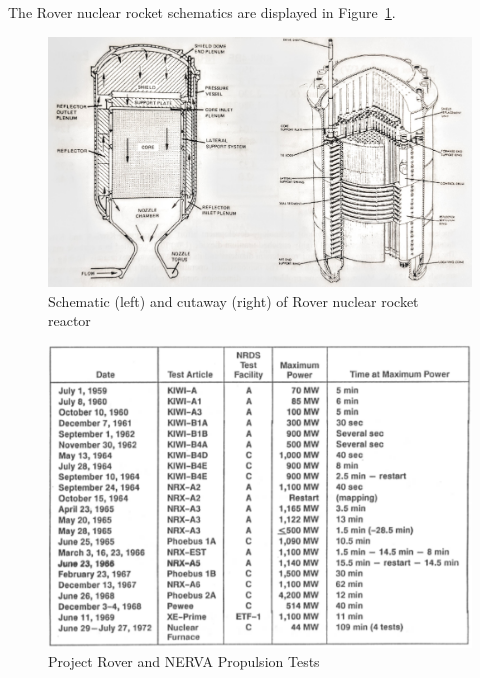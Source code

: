 \documentclass{article}
\begin{document}
The Rover nuclear rocket schematics are displayed in Figure~\ref{appX}.

\begin{figure}[]
	\centering
	\includegraphics[height=0.45\textheight]{fig/appX}
	\caption[Schematic (left) and cutaway (right) of Rover nuclear rocket reactor]{Schematic (left) and cutaway (right) of Rover nuclear rocket reactor~\cite{wanl1613}}
	\label{appX}
\end{figure}



\begin{figure}[]
	\centering
	\includegraphics[height=0.45\textheight]{fig/appJ}
	\caption[Project Rover and NERVA Propulsion Tests]{Project Rover and NERVA Propulsion Tests ~\cite{gerrish2014nuclear}}
	\label{appJ}
\end{figure}
\end{document}

